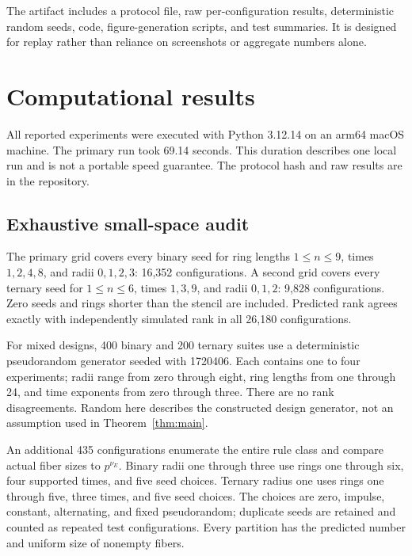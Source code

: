 \documentclass{ijuc}
\begin{document}
The artifact includes a protocol file, raw per-configuration results, deterministic random seeds, code, figure-generation scripts, and test summaries. It is designed for replay rather than reliance on screenshots or aggregate numbers alone.

\section{Computational results}
All reported experiments were executed with Python 3.12.14 on an arm64 macOS machine. The primary run took 69.14 seconds. This duration describes one local run and is not a portable speed guarantee. The protocol hash and raw results are in the repository.

\subsection{Exhaustive small-space audit}
The primary grid covers every binary seed for ring lengths $1\leq n\leq9$, times $1,2,4,8$, and radii $0,1,2,3$: 16,352 configurations. A second grid covers every ternary seed for $1\leq n\leq6$, times $1,3,9$, and radii $0,1,2$: 9,828 configurations. Zero seeds and rings shorter than the stencil are included. Predicted rank agrees exactly with independently simulated rank in all 26,180 configurations.

For mixed designs, 400 binary and 200 ternary suites use a deterministic pseudorandom generator seeded with 1720406. Each contains one to four experiments; radii range from zero through eight, ring lengths from one through 24, and time exponents from zero through three. There are no rank disagreements. Random here describes the constructed design generator, not an assumption used in Theorem~\ref{thm:main}.

An additional 435 configurations enumerate the entire rule class and compare actual fiber sizes to $p^{\nu_E}$. Binary radii one through three use rings one through six, four supported times, and five seed choices. Ternary radius one uses rings one through five, three times, and five seed choices. The choices are zero, impulse, constant, alternating, and fixed pseudorandom; duplicate seeds are retained and counted as repeated test configurations. Every partition has the predicted number and uniform size of nonempty fibers.
\end{document}
